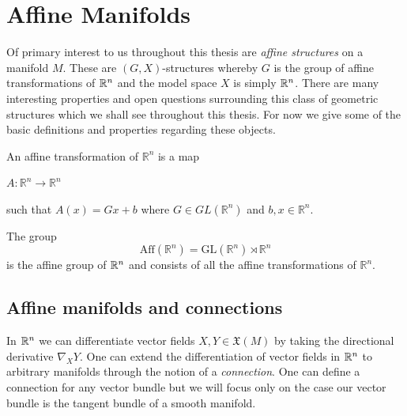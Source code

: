 \section{Affine Manifolds}
Of primary interest to us throughout this thesis are \emph{affine structures}
on a manifold $M$. These are $(G,X)$-structures whereby $G$ is the group of
affine transformations of $\mathbb{R}^n$ and the model space $X$ is simply $\mathbb{R}^n$.
There are many interesting properties and open questions surrounding this class
of geometric structures which we shall see throughout this thesis. For now we
give some of the basic definitions and properties regarding these objects.

\begin{definition}
    An affine transformation of $\mathbb{R}^n$ is a map
    \begin{center}
        $A: \mathbb{R}^n \to \mathbb{R}^n$
    \end{center}
    such that $A(x) = Gx + b$ where $G \in GL(\mathbb{R}^n)$ and $b,x \in\mathbb{R}^n$.
\end{definition}
\begin{definition}
    The group $$\text{Aff}(\mathbb{R}^n) =
        \text{GL}(\mathbb{R}^n )\rtimes \mathbb{R}^n$$ is the affine group of $\mathbb{R}^n$ and consists of all the affine transformations of
    $\mathbb{R}^n$.
\end{definition}

\subsection{Affine manifolds and connections}

In $\mathbb{R}^n$ we can differentiate vector fields $X, Y \in \mathfrak{X}(M)$ by
taking the directional derivative $\nabla_X Y$. One can extend the
differentiation of vector fields in $\mathbb{R}^n$ to arbitrary manifolds through the
notion of a \emph{connection}. One can define a connection for any vector
bundle but we will focus only on the case our vector bundle is the tangent
bundle of a smooth manifold.

